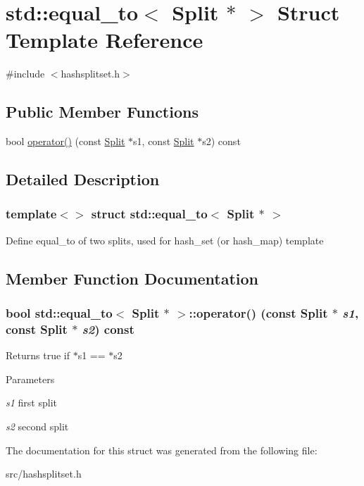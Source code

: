 \hypertarget{structstd_1_1equal__to_3_01Split_01_5_01_4}{
\section{std::equal\_\-to$<$ Split $\ast$ $>$ Struct Template Reference}
\label{structstd_1_1equal__to_3_01Split_01_5_01_4}
}


{\ttfamily \#include $<$hashsplitset.h$>$}\subsection*{Public Member Functions}
\begin{DoxyCompactItemize}
\item 
bool \hyperlink{structstd_1_1equal__to_3_01Split_01_5_01_4_aea844965cab3be25f669b684bef7dc21}{operator()} (const \hyperlink{classSplit}{Split} $\ast$s1, const \hyperlink{classSplit}{Split} $\ast$s2) const 
\end{DoxyCompactItemize}


\subsection{Detailed Description}
\subsubsection*{template$<$$>$ struct std::equal\_\-to$<$ Split $\ast$ $>$}

Define equal\_\-to of two splits, used for hash\_\-set (or hash\_\-map) template 

\subsection{Member Function Documentation}
\hypertarget{structstd_1_1equal__to_3_01Split_01_5_01_4_aea844965cab3be25f669b684bef7dc21}{
\subsubsection[{operator()}]{\setlength{\rightskip}{0pt plus 5cm}bool std::equal\_\-to$<$ {\bf Split} $\ast$ $>$::operator() (const {\bf Split} $\ast$ {\em s1}, \/  const {\bf Split} $\ast$ {\em s2}) const}}
\label{structstd_1_1equal__to_3_01Split_01_5_01_4_aea844965cab3be25f669b684bef7dc21}
\begin{DoxyReturn}{Returns}
true if $\ast$s1 == $\ast$s2 
\end{DoxyReturn}

\begin{DoxyParams}{Parameters}
\item[{\em s1}]first split \item[{\em s2}]second split \end{DoxyParams}


The documentation for this struct was generated from the following file:\begin{DoxyCompactItemize}
\item 
src/hashsplitset.h\end{DoxyCompactItemize}
